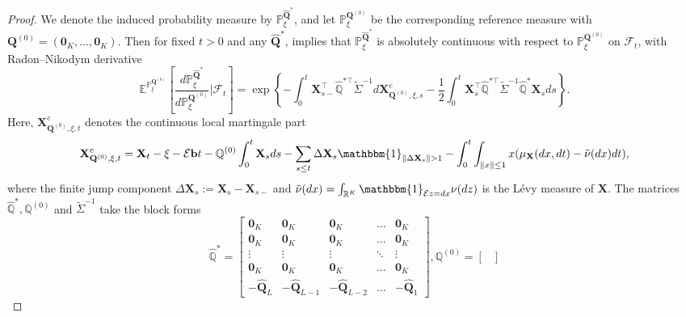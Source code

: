 \documentclass[12pt]{amsart}
\numberwithin{equation}{section}
\newcommand{\R}{\mathbb{R}}
\newcommand{\E}{\mathbb{E}}
\newcommand{\1}{\mathbf{1}}
\begin{document}
\begin{proof}
We denote the induced probability measure by $\mathbb{P}^{\hat{\mathbf{Q}}^*}_{\xi}$, and let $\mathbb{P}^{\mathbf{Q}^{(0)}}_{\xi}$ be the corresponding reference measure with $\mathbf{Q}^{(0)}=(\mathbf{0}_K,\dots,\mathbf{0}_K)$. Then for fixed $t>0$ and any $\hat{\mathbf{Q}}^*$, \cite[Proposition 3.1]{lucchese2026estimation} implies that $\mathbb{P}^{\hat{\mathbf{Q}}^*}_{\xi}$ is absolutely continuous with respect to $\mathbb{P}^{\mathbf{Q}^{(0)}}_{\xi}$ on $\mathcal{F}_t$, with Radon–Nikodym derivative
\begin{equation}
\label{likelihood}
\E^{\mathbb{P}^{\mathbf{Q}^{(0)}}_{\xi}}\left[\frac{d\mathbb{P}^{\hat{\mathbf{Q}}^*}_{\xi}}{d\mathbb{P}^{\mathbf{Q}^{(0)}}_{\xi}}\biggr\vert\mathcal{F}_t\right]=\exp\left\lbrace-\int_0^t\mathbf{X}_{s-}^{\top}\hat{\mathbb{Q}}^{*{\top}}\tilde{\Sigma}^{-1}d\mathbf{X}_{\mathbf{Q}^{(0)},\xi,s}^{c}-\frac{1}{2}\int_0^t\mathbf{X}_s^{\top}\hat{\mathbb{Q}}^{*{\top}}\tilde{\Sigma}^{-1}\hat{\mathbb{Q}}^*\mathbf{X}_sds\right\rbrace.
\end{equation}
Here, $\mathbf{X}_{\mathbf{Q}^{(0)},\xi,t}^{c}$ denotes the continuous local martingale part
\begin{equation}
\label{martingale}
\mathbf{X}_{\mathbf{Q}^{(0)},\xi,t}^{c}=\mathbf{X}_t-\xi-\mathcal{E}\mathbf{b}t-\mathbb{Q}^{(0)}\int_0^t\mathbf{X}_sds
-\sum_{s\leq t}\Delta \mathbf{X}_s\mathbbm{1}_{\Vert\Delta\mathbf{X}_s\Vert>1}-\int_0^t\int_{\Vert x\Vert\leq 1}x(\mu_\mathbf{X}(dx,dt)-\tilde{\nu}(dx)dt),
\end{equation}
where the finite jump component $\Delta\mathbf{X}_s := \mathbf{X}_s-\mathbf{X}_{s-}$ and $\tilde{\nu}(dx)=\int_{\R^K}\mathbbm{1}_{\mathcal{E}z=dx}\nu(dz)$ is the  L\'evy measure of $\mathbf{X}$. The matrices $\hat{\mathbb{Q}}^*,\mathbb{Q}^{(0)}$ and $\tilde{\Sigma}^{-1}$ take the block forms
\begin{equation*}
    \hat{\mathbb{Q}}^*=\begin{bmatrix}
    \mathbf{0}_{K} & \mathbf{0}_{K} & \mathbf{0}_{K} & \dots & \mathbf{0}_{K}\\
    \mathbf{0}_{K} & \mathbf{0}_{K} & \mathbf{0}_{K}  & \dots & \mathbf{0}_{K}\\
    \vdots & \vdots & \vdots & \ddots & \vdots  \\
    \mathbf{0}_{K} & \mathbf{0}_{K} & \mathbf{0}_{K} & \dots & \mathbf{0}_{K}\\
    -\hat{\mathbf{Q}}_L & -\hat{\mathbf{Q}}_{L-1} & -\hat{\mathbf{Q}}_{L-2} & \dots  & -\hat{\mathbf{Q}}_1
\end{bmatrix}, \mathbb{Q}^{(0)} = \begin{bmatrix}

\end{bmatrix}
\end{equation*}
\end{proof}
\end{document}
